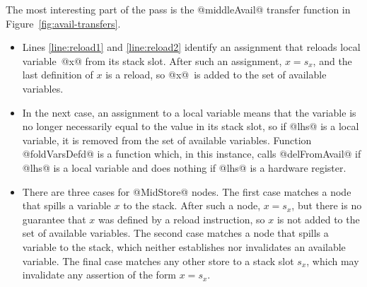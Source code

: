 \documentclass[blockstyle,preprint,nocopyrightspace]{sigplanconf}
\newcommand\slotof[1]{\ensuremath{s_{#1}}}
\let\slotOf=\slotof
\newcommand{\authornote}[1]{{\em #1}}
\def\authornote#1{\unskip\relax}
\newcommand{\simon}[1]{\authornote{SLPJ: #1}}
\newcommand{\norman}[1]{\authornote{NR: #1}}
\let\remark\norman
\def\finalremark#1{\relax}
\newcommand{\john}[1]{\authornote{JD: #1}}
\newcommand\figref[1]{Figure~\ref{fig:#1}}
\begin{document}
The most interesting part of the pass is the @middleAvail@ transfer
function in \figref{avail-transfers}.
\simon{Hang on!  We have not discussed the data type for middle or last nodes, 
yet they are essential to understand the code. This is a tough
one, because there is a fair amoutn to say.}
\begin{itemize}
\item
Lines \ref{line:reload1} and \ref{line:reload2}
identify an assignment that reloads local
variable~@x@ from its stack slot.\finalremark{I propose the compiler be
modified to use @isStackSlotOf@ as I've written. JD~approves.}
After such an assignment, $x = \slotof x$,
and the last definition of $x$ is a reload,
so @x@~is added to the set of available variables.
\item
In the next case, an assignment to a local variable means that the
variable is no longer necessarily equal to the value in its stack
slot, so if @lhs@ is a local variable, it is removed from the set of
available variables.
Function @foldVarsDefd@ is a function which, in this
instance, calls @delFromAvail@ if @lhs@ is a local variable and does
nothing if @lhs@ is a hardware register.
\remark{To Simon and John: I've removed ``overloaded but am a bit nervous
because @foldVarsDef@ shows up as overloaded later in the paper, and I
had thought to signpost it here.  Your thoughts?}
\item 
There are three cases for @MidStore@ nodes.
The first case matches a node that spills a variable $x$ to the stack.
After such a node, $x = \slotOf x$,
but there is no guarantee that $x$ was defined by a reload instruction,
so $x$ is not added to the set of available variables.
The second case matches a node that spills a variable to the stack,
which neither establishes nor invalidates an available variable.
The final case matches any other store to a stack slot $\slotof x$,
which may invalidate any assertion of the form $x = \slotof x$.



\end{itemize}
\end{document}
